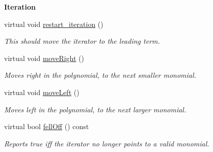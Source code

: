 \begin{Indent}\textbf{ Iteration}\par
\begin{DoxyCompactItemize}
\item 
\mbox{\label{class_mutable___constant___polynomial___iterator_a75e2870e5428bd6e38e57b7b2b9c46d1}} 
virtual void \hyperlink{class_mutable___constant___polynomial___iterator_a75e2870e5428bd6e38e57b7b2b9c46d1}{restart\+\_\+iteration} ()
\begin{DoxyCompactList}\small\item\em This should move the iterator to the leading term. \end{DoxyCompactList}\item 
\mbox{\label{class_mutable___constant___polynomial___iterator_af4c46d27db7487bddc63d8fbd68b0066}} 
virtual void \hyperlink{class_mutable___constant___polynomial___iterator_af4c46d27db7487bddc63d8fbd68b0066}{move\+Right} ()
\begin{DoxyCompactList}\small\item\em Moves right in the polynomial, to the next smaller monomial. \end{DoxyCompactList}\item 
\mbox{\label{class_mutable___constant___polynomial___iterator_a471a711a493fda4a39d29bc37ea744c5}} 
virtual void \hyperlink{class_mutable___constant___polynomial___iterator_a471a711a493fda4a39d29bc37ea744c5}{move\+Left} ()
\begin{DoxyCompactList}\small\item\em Moves left in the polynomial, to the next larger monomial. \end{DoxyCompactList}\item 
virtual bool \hyperlink{class_mutable___constant___polynomial___iterator_a5b6d56b68ad61ecaaf27f8370d1c2d31}{fell\+Off} () const
\begin{DoxyCompactList}\small\item\em Reports true iff the iterator no longer points to a valid monomial. \end{DoxyCompactList}\end{DoxyCompactItemize}
\end{Indent}

